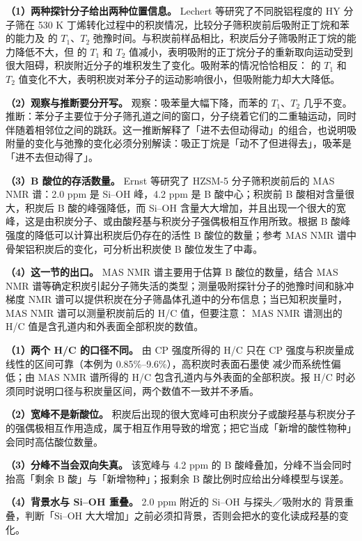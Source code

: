 \begin{dataflow}
\textbf{（1）两种探针分子给出两种位置信息。} Lechert 等研究了不同脱铝程度的 HY 分子筛在 530 K 丁烯转化过程中的积炭情况，比较分子筛积炭前后吸附正丁烷和苯的能力及  的 $T_1$、$T_2$ 弛豫时间。与积炭前样品相比，积炭后分子筛吸附正丁烷的能力降低不大，但  的 $T_1$ 和 $T_2$ 值减小，表明吸附的正丁烷分子的重新取向运动受到很大阻碍，积炭附近分子的堆积发生了变化。吸附苯的情况恰恰相反： 的 $T_1$ 和 $T_2$ 值变化不大，表明积炭对苯分子的运动影响很小，但吸附能力却大大降低。

\textbf{（2）观察与推断要分开写。} 观察：吸苯量大幅下降，而苯的 $T_1$、$T_2$ 几乎不变。推断：苯分子主要位于分子筛孔道之间的窗口，分子绕着它们的二重轴运动，同时伴随着相邻位之间的跳跃。这一推断解释了「进不去但动得动」的组合，也说明吸附量的变化与弛豫的变化必须分别解读：吸正丁烷是「动不了但进得去」，吸苯是「进不去但动得了」。

\textbf{（3）B 酸位的存活数量。} Ernst 等研究了 HZSM-5 分子筛积炭前后的  MAS NMR 谱：2.0 ppm 是 Si--OH 峰，4.2 ppm 是 B 酸中心；积炭前 B 酸相对含量很大，积炭后 B 酸的峰强降低，而 Si--OH 含量大大增加，并且出现一个很大的宽峰，这是由积炭分子、或由酸羟基与积炭分子强偶极相互作用所致。根据 B 酸峰强度的降低可以计算出积炭后仍存在的活性 B 酸位的数量；参考  MAS NMR 谱中骨架铝积炭后的变化，可分析出积炭使 B 酸位发生了中毒。

\textbf{（4）这一节的出口。}  MAS NMR 谱主要用于估算 B 酸位的数量，结合  MAS NMR 谱等确定积炭引起分子筛失活的类型；测量吸附探针分子的弛豫时间和脉冲梯度  NMR 谱可以提供积炭在分子筛晶体孔道中的分布信息；当已知积炭量时， MAS NMR 谱可以测量积炭前后的 H/C 值，但要注意： MAS NMR 谱测出的 H/C 值是含孔道内和外表面全部积炭的数值。
\end{dataflow}

\begin{pitfall}
\textbf{（1）两个 H/C 的口径不同。} 由  CP 强度所得的 H/C 只在 CP 强度与积炭量成线性的区间可靠（本例为 0.85\%--9.6\%），高积炭时表面石墨使  减少而系统性偏低；由  MAS NMR 谱所得的 H/C 包含孔道内与外表面的全部积炭。报 H/C 时必须同时说明口径与积炭量区间，两个数值不一致并不矛盾。

\textbf{（2）宽峰不是新酸位。} 积炭后出现的很大宽峰可由积炭分子或酸羟基与积炭分子的强偶极相互作用造成，属于相互作用导致的增宽；把它当成「新增的酸性物种」会同时高估酸位数量。

\textbf{（3）分峰不当会双向失真。} 该宽峰与 4.2 ppm 的 B 酸峰叠加，分峰不当会同时抬高「剩余 B 酸」与「新增物种」；报剩余 B 酸比例时应给出分峰模型与误差。

\textbf{（4）背景水与 Si--OH 重叠。} 2.0 ppm 附近的 Si--OH 与探头／吸附水的  背景重叠，判断「Si--OH 大大增加」之前必须扣背景，否则会把水的变化读成羟基的变化。
\end{pitfall}

